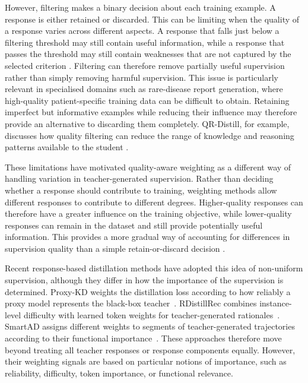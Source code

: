 \documentclass[ %
                    author={Aman Kumar Singh},
                supervisor={Dr. Edwin Simpson},
                    degree={MSc},
                     title={Quality-Aware Knowledge Distillation of Large Language Models for Efficient Personalised Clinical Report Generation},
                  subtitle={},
                      type={},
                      year={2021}]{dissertation}
\begin{document}
However, filtering makes a binary decision about each training example. A
response is either retained or discarded. This can be limiting when the
quality of a response varies across different aspects. A response that falls
just below a filtering threshold may still contain useful information, while
a response that passes the threshold may still contain weaknesses that are
not captured by the selected criterion \cite{shen_logitwise_2025}. Filtering can therefore remove
partially useful supervision rather than simply removing harmful supervision.
This issue is particularly relevant in specialised domains such as
rare-disease report generation, where high-quality patient-specific training
data can be difficult to obtain. Retaining imperfect but informative examples
while reducing their influence may therefore provide an alternative to
discarding them completely. QR-Distill, for example, discusses how quality
filtering can reduce the range of knowledge and reasoning patterns available
to the student \cite{lei_learning_2025}.

These limitations have motivated quality-aware weighting as a different way
of handling variation in teacher-generated supervision. Rather than deciding
whether a response should contribute to training, weighting methods allow
different responses to contribute to different degrees. Higher-quality
responses can therefore have a greater influence on the training objective,
while lower-quality responses can remain in the dataset and still provide
potentially useful information. This provides a more gradual way of accounting
for differences in supervision quality than a simple retain-or-discard
decision \cite{sun_uncertainty-aware_2026}.

Recent response-based distillation methods have adopted this idea of
non-uniform supervision, although they differ in how the importance of the
supervision is determined. Proxy-KD weights the
distillation loss according to how reliably a proxy model represents the
black-box teacher~\cite{chen_knowledge_2024}. RDistillRec combines
instance-level difficulty with learned token weights for teacher-generated
rationales~\cite{jiang_difficulty-aware_2027}. SmartAD assigns different weights to
segments of teacher-generated trajectories according to their functional
importance~\cite{tang_smartad_2026}. These approaches therefore move beyond treating all teacher
responses or response components equally. However, their weighting signals
are based on particular notions of importance, such as reliability,
difficulty, token importance, or functional relevance.
\end{document}
